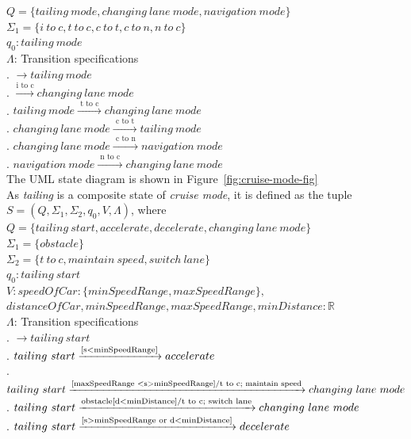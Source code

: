 \documentclass[12pt]{article}
\begin{document}
\begin{spacing}{1.5}
\noindent $Q = \{tailing~mode, changing~lane~mode, navigation~mode\}$\\
\noindent $\Sigma_1 = \{i~to~c, t~to~c, c~to~t, c~to~n, n~to~c\}$\\
\noindent $q_0: tailing~mode$\\
\noindent $\Lambda$: Transition specifications\\
. $\rightarrow tailing~mode$\\
. $\xrightarrow {\text{i to c}} changing~lane~mode$\\
. $tailing~mode \xrightarrow {\text { t to c }} changing~lane~mode$\\
. $changing~lane~mode \xrightarrow {\text { c to t }} tailing~mode$\\
. $changing~lane~mode \xrightarrow {\text { c to n }} navigation~mode$\\
. $navigation~mode \xrightarrow {\text { n to c }} changing~lane~mode$\\

\noindent The UML state diagram is shown in Figure~\ref{fig:cruise-mode-fig}\\


\noindent As \textit{tailing} is a composite state of \textit{cruise mode}, it is defined as the tuple $S = (Q, \Sigma_1, \Sigma_2, q_0, V, \Lambda)$, where\\

\noindent $Q = \{tailing~start, accelerate, decelerate, changing~lane~mode\}$\\
\noindent $\Sigma_1 = \{obstacle\}$\\
\noindent $\Sigma_2 = \{t~to~c, maintain~speed, switch~lane\}$\\
\noindent $q_0: tailing~start$\\
\noindent $V: speedOfCar : \{minSpeedRange, maxSpeedRange\},$\\
\indent $distanceOfCar, minSpeedRange, maxSpeedRange, minDistance: \mathbb{R} $\\
\noindent $\Lambda$: Transition specifications\\
. $\rightarrow tailing~start$\\
. $tailing~start\xrightarrow {\text{[s\textless minSpeedRange]}} accelerate$\\
. $tailing~start\xrightarrow {\text{[maxSpeedRange \textless s\textgreater minSpeedRange]/t to c; maintain speed}} changing~lane~mode$\\
. $tailing~start\xrightarrow {\text{obstacle[d\textless minDistance]/t to c; switch lane}} changing~lane~mode$\\
. $tailing~start\xrightarrow {\text{[s\textgreater minSpeedRange or d\textless minDistance]}} decelerate$\\


\end{spacing}
\end{document}
